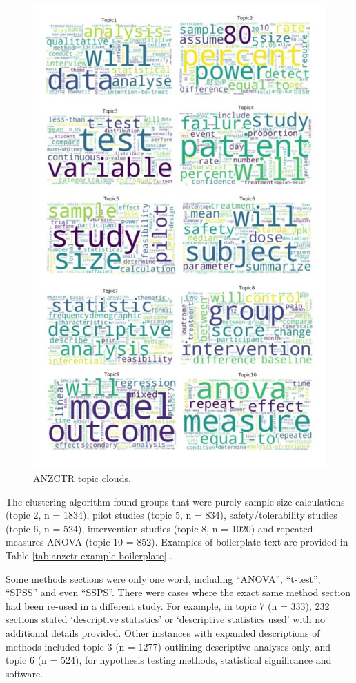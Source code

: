 \documentclass[12pt]{article}
\begin{document}
\begin{figure}

{\centering \includegraphics[width=0.7\linewidth]{figures/anzctrwordclouds} 

}

\caption{ANZCTR topic clouds.}\label{fig:unnamed-chunk-9}
\end{figure}

The clustering algorithm found groups that were purely sample size
calculations (topic 2, n = 1834), pilot studies (topic 5, n = 834),
safety/tolerability studies (topic 6, n = 524), intervention studies
(topic 8, n = 1020) and repeated measures ANOVA (topic 10 = 852).
Examples of boilerplate text are provided in Table
\ref{tab:anzctr-example-boilerplate} .

Some methods sections were only one word, including ``ANOVA'',
``t-test'', ``SPSS'' and even ``SSPS''. There were cases where the exact
same method section had been re-used in a different study. For example,
in topic 7 (n = 333), 232 sections stated `descriptive statistics' or
`descriptive statistics used' with no additional details provided. Other
instances with expanded descriptions of methods included topic 3 (n =
1277) outlining descriptive analyses only, and topic 6 (n = 524), for
hypothesis testing methods, statistical significance and software.
\end{document}

